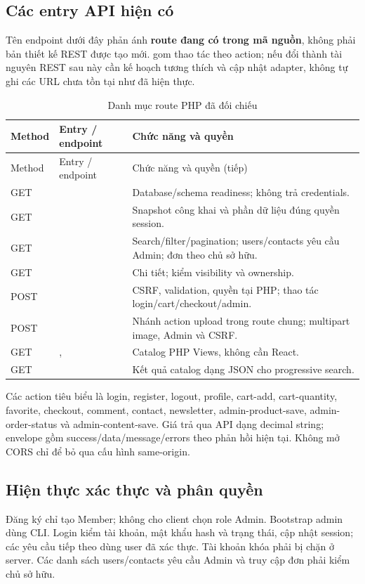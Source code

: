 \subsection{Các entry API hiện có}
Tên endpoint dưới đây phản ánh \textbf{route đang có trong mã nguồn}, không phải bản thiết kế REST được tạo mới.  gom thao tác theo action; nếu đổi thành tài nguyên REST sau này cần kế hoạch tương thích và cập nhật adapter, không tự ghi các URL chưa tồn tại như đã hiện thực.
\begin{longtable}{@{}P{1.5cm}P{7cm}P{6cm}@{}}
\caption{Danh mục route PHP đã đối chiếu}\label{tab:api}\\
\toprule Method & Entry / endpoint & Chức năng và quyền\\\midrule\endfirsthead
\toprule Method & Entry / endpoint & Chức năng và quyền (tiếp)\\\midrule\endhead
GET &  & Database/schema readiness; không trả credentials.\\
GET &  & Snapshot công khai và phần dữ liệu đúng quyền session.\\
GET &  & Search/filter/pagination; users/contacts yêu cầu Admin; đơn theo chủ sở hữu.\\
GET &  & Chi tiết; kiểm visibility và ownership.\\
POST &  & CSRF, validation, quyền tại PHP; thao tác login/cart/checkout/admin.\\
POST &  & Nhánh action upload trong route chung; multipart image, Admin và CSRF.\\
GET & ,  & Catalog PHP Views, không cần React.\\
GET &  & Kết quả catalog dạng JSON cho progressive search.\\
\bottomrule\end{longtable}
Các action tiêu biểu là login, register, logout, profile, cart-add, cart-quantity, favorite, checkout, comment, contact, newsletter, admin-product-save, admin-order-status và admin-content-save. Giá trả qua API dạng decimal string; envelope gồm success/data/message/errors theo phản hồi hiện tại. Không mở CORS chỉ để bỏ qua cấu hình same-origin.

\subsection{Hiện thực xác thực và phân quyền}
Đăng ký chỉ tạo Member; không cho client chọn role Admin. Bootstrap admin dùng CLI. Login kiểm tài khoản, mật khẩu hash và trạng thái, cập nhật session; các yêu cầu tiếp theo dùng user đã xác thực. Tài khoản khóa phải bị chặn ở server. Các danh sách users/contacts yêu cầu Admin và truy cập đơn phải kiểm chủ sở hữu.

